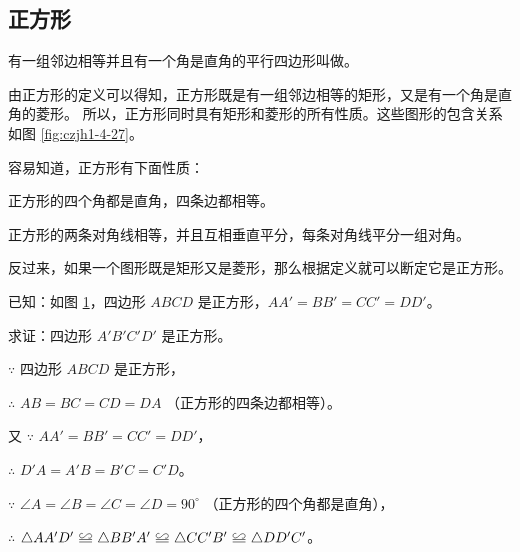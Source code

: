 \subsection{正方形}\label{subsec:czjh1-4-7}

有一组邻边相等并且有一个角是直角的平行四边形叫做。

由正方形的定义可以得知，正方形既是有一组邻边相等的矩形，又是有一个角是直角的菱形。
所以，正方形同时具有矩形和菱形的所有性质。这些图形的包含关系如图 \ref{fig:czjh1-4-27}。

\begin{figure}[htbp]
    \centering
    \begin{minipage}[b]{7cm}
        \centering
        
        \caption{}\label{fig:czjh1-4-27}
    \end{minipage}
    \qquad
    \begin{minipage}[b]{7cm}
        \centering
        
        \caption{}\label{fig:czjh1-4-28}
    \end{minipage}
\end{figure}

容易知道，正方形有下面性质：

\begin{dingli}[正方形性质定理1]
    正方形的四个角都是直角，四条边都相等。
\end{dingli}

\begin{dingli}[正方形性质定理2]
    正方形的两条对角线相等，并且互相垂直平分，每条对角线平分一组对角。
\end{dingli}

反过来，如果一个图形既是矩形又是菱形，那么根据定义就可以断定它是正方形。


\liti[0] 已知：如图 \ref{fig:czjh1-4-28}，四边形 $ABCD$ 是正方形，$AA' = BB' = CC' = DD'$。

求证：四边形 $A'B'C'D'$ 是正方形。

\zhengming  $\because$ \quad 四边形 $ABCD$ 是正方形，

$\therefore$ \quad $AB = BC = CD = DA$ （正方形的四条边都相等）。

又 $\because$ \quad $AA' = BB' = CC' = DD'$，

$\therefore$ \quad $D'A = A'B = B'C = C'D$。

$\because$ \quad $\angle A = \angle B = \angle C = \angle D = 90^\circ$ （正方形的四个角都是直角），

$\therefore$ \quad $\triangle AA'D' \quandeng \triangle BB'A' \quandeng \triangle CC'B' \quandeng \triangle DD'C'$。

